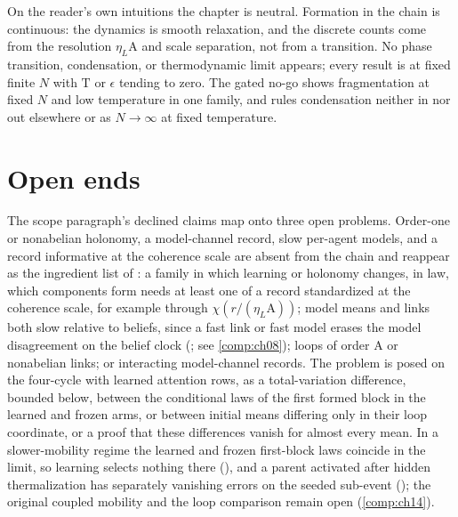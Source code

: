 On the reader's own intuitions the chapter is neutral. Formation in the chain is continuous: the dynamics is
smooth relaxation, and the discrete counts come from the resolution \(\eta_L\mathrm A\) and scale separation,
not from a transition. No phase transition, condensation, or thermodynamic limit appears; every result is at
fixed finite \(N\) with \(\mathrm T\) or \(\epsilon\) tending to zero. The gated no-go shows fragmentation at fixed
\(N\) and low temperature in one family, and rules condensation neither in nor out elsewhere or as
\(N\to\infty\) at fixed temperature.

\section{Open ends}
\label{comp:ch13-open}

The scope paragraph's declined claims map onto three open problems. Order-one or nonabelian holonomy, a
model-channel record, slow per-agent models, and a record informative at the coherence scale are absent
from the chain and reappear as the ingredient list of : a family in
which learning or holonomy changes, in law, which components form needs at least one of a record
standardized at the coherence scale, for example through \(\chi(r/(\eta_L\mathrm A))\); model means and links
both slow relative to beliefs, since a fast link or fast model erases the model disagreement on the belief
clock (; see \cref{comp:ch08}); loops of order \(\mathrm A\) or
nonabelian links; or interacting model-channel records. The problem is posed on the four-cycle with learned
attention rows, as a total-variation difference, bounded below, between the conditional laws of the first
formed block in the learned and frozen arms, or between initial means differing only in their loop
coordinate, or a proof that these differences vanish for almost every mean. In a slower-mobility regime the
learned and frozen first-block laws coincide in the limit, so learning selects nothing there
(), and a parent activated after hidden thermalization has separately
vanishing errors on the seeded sub-event (); the original coupled mobility
and the loop comparison remain open (\cref{comp:ch14}).

